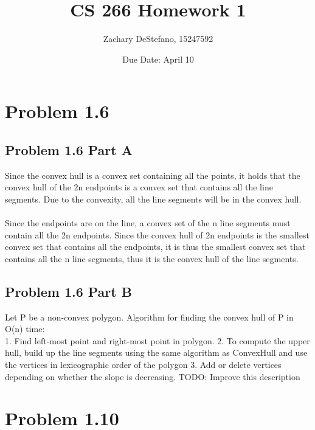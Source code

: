 \documentclass[11pt,psfig]{article}
\begin{document}
\setlength{\parskip}{1.2ex plus0.3ex minus 0.3ex}


\thispagestyle{empty} \pagestyle{myheadings} 



\title{CS 266 Homework 1}
\author{Zachary DeStefano, 15247592}
\date{Due Date: April 10}

\maketitle

\vfill\eject

\section*{Problem 1.6}

\subsection*{Problem 1.6 Part A}

Since the convex hull is a convex set containing all the points, it holds that the convex hull of the 2n endpoints is a convex set that contains all the line segments. Due to the convexity, all the line segments will be in the convex hull. 
\\
\\
Since the endpoints are on the line, a convex set of the n line segments must contain all the 2n endpoints. Since the convex hull of 2n endpoints is the smallest convex set that contains all the endpoints, it is thus the smallest convex set that contains all the n line segments, thus it is the convex hull of the line segments. 

\subsection*{Problem 1.6 Part B}

Let P be a non-convex polygon. Algorithm for finding the convex hull of P in O(n) time:
\\
1. Find left-most point and right-most point in polygon. 
2. To compute the upper hull, build up the line segments using the same algorithm as ConvexHull and use the vertices in lexicographic order of the polygon
3. Add or delete vertices depending on whether the slope is decreasing. 
TODO: Improve this description

\section*{Problem 1.10}
\end{document}
